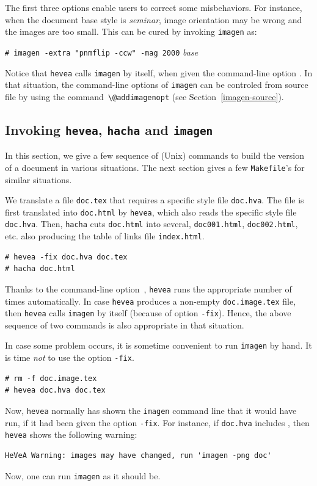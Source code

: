 The first three options enable users to correct some misbehaviors.
For instance, when the document base style is \textit{seminar}, image
orientation may
be wrong and the images are too small. This can be cured by invoking
\texttt{imagen} as:
\begin{flushleft}
\texttt{\# imagen  -extra "pnmflip -ccw" -mag 2000} \textit{base}
\end{flushleft}

Notice that \texttt{hevea} calls \texttt{imagen} by itself,
when given the command-line option .
In that situation, the command-line options of \texttt{imagen} can
be controled from source file by using the
command~\verb+\@addimagenopt+ (see Section~\ref{imagen-source}).

\subsection{Invoking \texttt{hevea}, \texttt{hacha} and \texttt{imagen}}
In this section, we give a few sequence of (Unix) commands to build
the \html{} version of a document in various
situations. The next section gives a few
\texttt{Makefile}'s for similar situations.

We translate a file \texttt{doc.tex}
that requires a specific style file \texttt{doc.hva}.
The file is first translated into \texttt{doc.html} by \texttt{hevea},
which also reads
the specific style file \texttt{doc.hva}.
Then, \texttt{hacha} cuts \texttt{doc.html} into several,
\texttt{doc001.html}, \texttt{doc002.html}, etc. also producing the
table of links file \texttt{index.html}.
\begin{verbatim}
# hevea -fix doc.hva doc.tex
# hacha doc.html
\end{verbatim}
Thanks to the command-line option~, \texttt{hevea} runs the
appropriate number of times automatically.
In case \texttt{hevea} produces a non-empty \texttt{doc.image.tex}
file, then \texttt{hevea} calls \texttt{imagen} by itself
(because of option \texttt{-fix}).
Hence, the above sequence of two commands is also appropriate in
that situation.

In case some problem occurs, it is sometime convenient to
run \texttt{imagen} by hand.
It is time \emph{not} to use the option \texttt{-fix}.
\begin{verbatim}
# rm -f doc.image.tex
# hevea doc.hva doc.tex
\end{verbatim}
Now, \texttt{hevea} normally has shown the \texttt{imagen}
command line that it would have run, if it had been given
the option \texttt{-fix}.
For instance, if \texttt{doc.hva} includes \verb++, then
\texttt{hevea} shows the following warning:
\begin{verbatim}
HeVeA Warning: images may have changed, run 'imagen -png doc'
\end{verbatim}
Now, one can run \texttt{imagen} as it should be.

